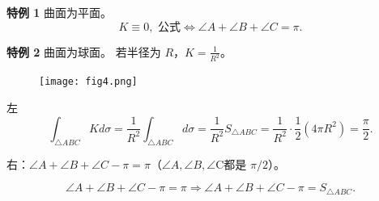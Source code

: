 \documentclass[lang=cn,10pt,thmcnt=section]{elegantbook}
\begin{document}
\textbf{特例 1} 曲面为平面。
\[
K \equiv 0, \text{ 公式} \Leftrightarrow \angle A + \angle B + \angle C = \pi.
\]

\textbf{特例 2} 曲面为球面。
若半径为 \( R \)，\( K = \frac{1}{R^2} \)。
\begin{figure}[h]
    \centering
    \texttt{[image: fig4.png]} %
\end{figure}

左
\[
 \int_{\triangle ABC} K d\sigma = \frac{1}{R^2} \int_{\triangle ABC} d\sigma = \frac{1}{R^2} S_{\triangle ABC}= \frac{1}{R^2} \cdot \frac{1}{2} (4\pi R^2) = \frac{\pi}{2}.
\]

右：\(\angle A + \angle B + \angle C - \pi = \pi\)（$\angle A , \angle B ,  \angle $C都是 \(\pi/2\)）。

\[
\angle A + \angle B + \angle C - \pi = \pi \Rightarrow \angle A + \angle B + \angle C - \pi = S_{\triangle ABC}.
\]
\end{document}

